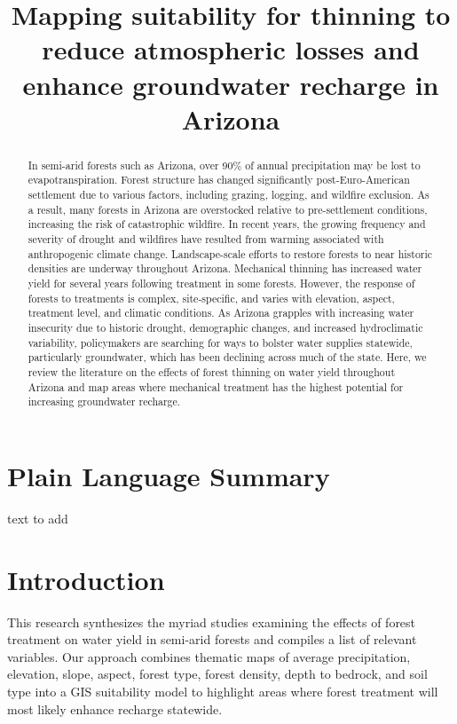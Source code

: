 \documentclass[
]{agujournal2019}
\begin{document}
\title{Mapping suitability for thinning to reduce atmospheric losses and
enhance groundwater recharge in Arizona}



\begin{abstract}
In semi-arid forests such as Arizona, over 90\% of annual precipitation
may be lost to evapotranspiration. Forest structure has changed
significantly post-Euro-American settlement due to various factors,
including grazing, logging, and wildfire exclusion. As a result, many
forests in Arizona are overstocked relative to pre-settlement
conditions, increasing the risk of catastrophic wildfire. In recent
years, the growing frequency and severity of drought and wildfires have
resulted from warming associated with anthropogenic climate change.
Landscape-scale efforts to restore forests to near historic densities
are underway throughout Arizona. Mechanical thinning has increased water
yield for several years following treatment in some forests. However,
the response of forests to treatments is complex, site-specific, and
varies with elevation, aspect, treatment level, and climatic conditions.
As Arizona grapples with increasing water insecurity due to historic
drought, demographic changes, and increased hydroclimatic variability,
policymakers are searching for ways to bolster water supplies statewide,
particularly groundwater, which has been declining across much of the
state. Here, we review the literature on the effects of forest thinning
on water yield throughout Arizona and map areas where mechanical
treatment has the highest potential for increasing groundwater recharge.
\end{abstract}

\section*{Plain Language Summary}
text to add




\section{Introduction}\label{introduction}

This research synthesizes the myriad studies examining the effects of
forest treatment on water yield in semi-arid forests and compiles a list
of relevant variables. Our approach combines thematic maps of average
precipitation, elevation, slope, aspect, forest type, forest density,
depth to bedrock, and soil type into a GIS suitability model to
highlight areas where forest treatment will most likely enhance recharge
statewide.
\end{document}
